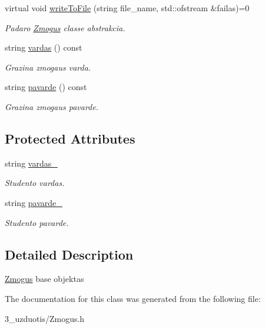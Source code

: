 \begin{DoxyCompactItemize}
virtual void \mbox{\hyperlink{class_zmogus_ac61c2abedd1403a2a3d5db3984363162}{write\+To\+File}} (string file\+\_\+name, std\+::ofstream \&failas)=0
\begin{DoxyCompactList}\small\item\em Padaro \mbox{\hyperlink{class_zmogus}{Zmogus}} class\textquotesingle{}e abstrakcia. \end{DoxyCompactList}\item 
\mbox{\label{class_zmogus_a9ba88c78eedc8094a3b38cdf55228bae}} 
string \mbox{\hyperlink{class_zmogus_a9ba88c78eedc8094a3b38cdf55228bae}{vardas}} () const
\begin{DoxyCompactList}\small\item\em Grazina zmogaus varda. \end{DoxyCompactList}\item 
\mbox{\label{class_zmogus_a0ccc9864e6fb821e519fc50afd96dfe1}} 
string \mbox{\hyperlink{class_zmogus_a0ccc9864e6fb821e519fc50afd96dfe1}{pavarde}} () const
\begin{DoxyCompactList}\small\item\em Grazina zmogaus pavarde. \end{DoxyCompactList}\end{DoxyCompactItemize}
\subsection*{Protected Attributes}
\begin{DoxyCompactItemize}
\item 
\mbox{\label{class_zmogus_a09b290c9be6039ce3a94e1557def9b3a}} 
string \mbox{\hyperlink{class_zmogus_a09b290c9be6039ce3a94e1557def9b3a}{vardas\+\_\+}}
\begin{DoxyCompactList}\small\item\em Studento vardas. \end{DoxyCompactList}\item 
\mbox{\label{class_zmogus_a95b83ef4d9bbe9b88d78c17563bafa5a}} 
string \mbox{\hyperlink{class_zmogus_a95b83ef4d9bbe9b88d78c17563bafa5a}{pavarde\+\_\+}}
\begin{DoxyCompactList}\small\item\em Studento pavarde. \end{DoxyCompactList}\end{DoxyCompactItemize}


\subsection{Detailed Description}
\mbox{\hyperlink{class_zmogus}{Zmogus}} base objektas 

The documentation for this class was generated from the following file\+:\begin{DoxyCompactItemize}
\item 
3\+\_\+uzduotis/Zmogus.\+h\end{DoxyCompactItemize}
